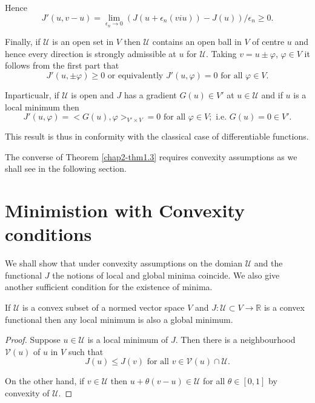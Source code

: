 Hence
$$
J'(u, v-u) = \lim_{\epsilon_{n} \to 0} (J(u + \epsilon_{n}(viu)) - J(u))/ \epsilon_{n} \geq 0.
$$

Finally, if $\mathcal{U}$ is an open set in $V$ then $\mathcal{U}$ contains an open ball in $V$ of centre $u$ and hence every direction is strongly admissible at $u$ for $\mathcal{U}$. Taking $v = u \pm \varphi$, $\varphi \in V$ it follows from the first part that
$$
J'(u, \pm \varphi) \geq 0 \text{ or equivalently } J'(u, \varphi) = 0 \text{ for all } \varphi \in V.
$$

In\pageoriginale particualr, if $\mathcal{U}$ is open and $J$ has a gradient $G(u) \in V'$ at $u \in \mathcal{U}$ and if $u$ is a local minimum then
$$
J'(u, \varphi) = <G(u), \varphi>_{V' \times V} = 0 \text{ for all } \varphi \in V ; \text{ i.e. } G(u) = 0 \in V'.
$$

This result is thus in conformity with the classical case of differentiable functions.

\begin{remark}\label{chap2-rem1.1}
The converse of Theorem \ref{chap2-thm1.3} requires convexity assumptions as we shall see in the following section.
\end{remark}

\section{Minimistion with Convexity conditions}\label{chap2-sec2}
We shall show that under convexity assumptions on the domian $\mathcal{U}$ and the functional $J$ the notions of local and global minima coincide. We also give another sufficient condition for the existence of minima.

\begin{lemma}\label{chap2-lem2.1}
If $\mathcal{U}$ is a convex subset of a normed vector space $V$ and $J : \mathcal{U} \subset V \to \mathbb{R}$ is a convex functional then any local minimum is also a global minimum.
\end{lemma}

\begin{proof}
Suppose $u \in \mathcal{U}$ is a local minimum of $J$. Then there is a neighbourhood $\mathscr{V}(u)$ of $u$ in $V$ such that
$$
J(u) \leq J(v) \text{ for all } v \in \mathscr{V} (u) \cap \mathcal{U}.
$$

On the other hand, if $v \in \mathcal{U}$ then $u + \theta (v-u) \in \mathcal{U}$ for all $\theta \in [0, 1]$ by convexity of $\mathcal{U}$.
\end{proof}

